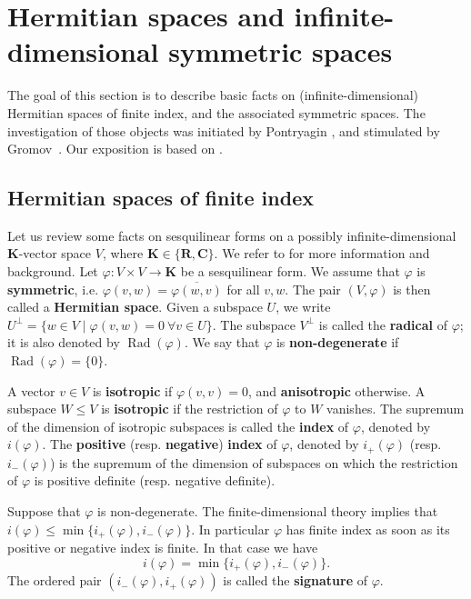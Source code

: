 \documentclass[12pt,a4paper]{amsproc}
\theoremstyle{definition}
\DeclareMathOperator{\Rad}{Rad}
\newcommand{\CC}{\mathbf C}
\newcommand{\KK}{\mathbf K}
\newcommand{\RR}{\mathbf R}
\begin{document}
\section{Hermitian spaces and infinite-dimensional symmetric spaces}
The goal of this section is to describe basic facts on (infinite-dimensional) Hermitian spaces of finite index, and the associated symmetric spaces. The investigation of those objects was initiated by Pontryagin \cite{Pont44}, and stimulated by Gromov~\cite[\S6.A.III]{Gromov}. Our exposition is based on \cite{BIM, DuchesnePhD, Duchesne, MoPy}. 

\subsection{Hermitian spaces of finite index}\label{sec:Hermitian}


Let us review some facts on sesquilinear forms on a  possibly infinite-dimensional $\KK$-vector space $V$, where $\KK \in \{\RR, \CC\}$. We refer to \cite[\S2]{BIM} for more information and background. Let $\varphi \colon V \times V \to \KK$ be a  sesquilinear form. We assume that $\varphi$ is \textbf{symmetric}, i.e. $\varphi(v, w) = \overline{\varphi(w, v)}$ for all $v, w$. The pair $(V, \varphi)$ is then called a \textbf{Hermitian space}. Given a subspace $U$, we write $U^\perp = \{w \in V\mid \varphi(v, w) = 0 \ \forall v \in U\}$. The subspace $V^\perp$ is called the \textbf{radical} of $\varphi$; it is also denoted by $\Rad(\varphi)$. We say that  $\varphi$ is \textbf{non-degenerate} if $\Rad(\varphi) =\{0\}$.

A vector $v \in V$ is \textbf{isotropic} if $\varphi(v, v) = 0$, and \textbf{anisotropic} otherwise. A subspace $W \leq V$ is \textbf{isotropic} if the restriction of $\varphi$ to $W$ vanishes. The supremum of the dimension of isotropic subspaces is called the \textbf{index} of $\varphi$, denoted by $i(\varphi)$.  The \textbf{positive} (resp. \textbf{negative}) \textbf{index} of $\varphi$, denoted by $i_+(\varphi)$ (resp. $i_-(\varphi)$) is the supremum of the dimension of subspaces on which the restriction of $\varphi$ is positive definite (resp. negative definite). 

Suppose that $\varphi$ is non-degenerate. The finite-dimensional theory implies that $i(\varphi)  \leq \min \{i_+(\varphi),i_-(\varphi)\}$. In particular $\varphi$ has finite index as soon as its positive or negative index is finite. In that case we have 
$$i(\varphi) = \min \{i_+(\varphi),i_-(\varphi)\}.$$ 
The ordered pair $(i_-(\varphi), i_+(\varphi))$ is called the \textbf{signature} of $\varphi$. 
\end{document}
